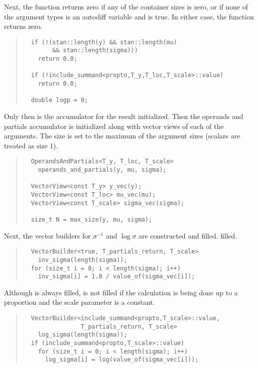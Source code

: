 \documentclass[10pt]{article}
\begin{document}
Next, the function returns zero if any of the container sizes is zero,
or if none of the argument types is an autodiff variable and
 is true.  In either case, the function returns zero.
%
\begin{quote}
\begin{Verbatim}
  if (!(stan::length(y) && stan::length(mu) 
        && stan::length(sigma)))
    return 0.0;

  if (!include_summand<propto,T_y,T_loc,T_scale>::value)
    return 0.0;

  double logp = 0;
\end{Verbatim}
\end{quote}
%
Only then is the accumulator  for the result initialized.
Then the operands and partials accumulator is initialized along with
vector views of each of the arguments.  The size  is set to
the maximum of the argument sizes (scalars are treated as size 1).
% 
\begin{quote}
\begin{Verbatim}
  OperandsAndPartials<T_y, T_loc, T_scale> 
    operands_and_partials(y, mu, sigma);

  VectorView<const T_y> y_vec(y);
  VectorView<const T_loc> mu_vec(mu);
  VectorView<const T_scale> sigma_vec(sigma);

  size_t N = max_size(y, mu, sigma);
\end{Verbatim}
\end{quote}
%
Next, the vector builders for $\sigma^{-1}$ and $\log \sigma$ are
constructed and filled.
filled.
%
\begin{quote}
\begin{Verbatim}
  VectorBuilder<true, T_partials_return, T_scale> 
    inv_sigma(length(sigma));
  for (size_t i = 0; i < length(sigma); i++)
    inv_sigma[i] = 1.0 / value_of(sigma_vec[i]);
\end{Verbatim}
\end{quote}
%
Although  is always filled,  is not
filled if the calculation is being done up to a proportion and the
scale parameter is a constant.
%
\begin{quote}
\begin{Verbatim}
  VectorBuilder<include_summand<propto,T_scale>::value, 
                T_partials_return, T_scale> 
    log_sigma(length(sigma));
  if (include_summand<propto,T_scale>::value)
    for (size_t i = 0; i < length(sigma); i++)
      log_sigma[i] = log(value_of(sigma_vec[i]));
\end{Verbatim}
\end{quote}
\end{document}
